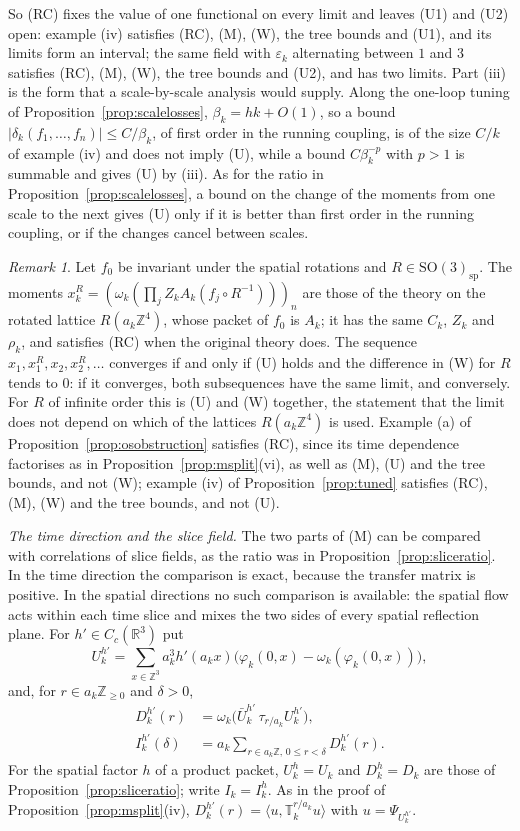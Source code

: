 \documentclass[aps,prd,twocolumn,superscriptaddress,nofootinbib,longbibliography,floatfix,amsmath,amssymb,10pt]{revtex4-2}
\theoremstyle{definition}
\theoremstyle{remark}
\newtheorem{remark}[theorem]{Remark}
\newcommand{\R}{\mathbb{R}}
\newcommand{\Z}{\mathbb{Z}}
\newcommand{\SO}{\mathrm{SO}}
\newcommand{\ip}[2]{\langle #1,#2\rangle}
\begin{document}
So (RC) fixes the value of one functional on every limit and leaves (U1)
and (U2) open: example (iv) satisfies (RC), (M), (W), the tree bounds and
(U1), and its limits form an interval; the same field with
$\varepsilon_k$ alternating between $1$ and $3$ satisfies (RC), (M),
(W), the tree bounds and (U2), and has two limits. Part (iii) is the form
that a scale-by-scale analysis would supply. Along the one-loop tuning of
Proposition~\ref{prop:scalelosses}, $\beta_k=hk+O(1)$, so a bound
$|\delta_k(f_1,\dots,f_n)|\le C/\beta_k$, of first order in the running
coupling, is of the size $C/k$ of example (iv) and does not imply (U),
while a bound $C\beta_k^{-p}$ with $p>1$ is summable and gives (U) by
(iii). As for the ratio in Proposition~\ref{prop:scalelosses}, a bound on
the change of the moments from one scale to the next gives (U) only if it
is better than first order in the running coupling, or if the changes
cancel between scales.

\begin{remark}\label{rem:rotatedlattice}
Let $f_0$ be invariant under the spatial rotations and
$R\in\SO(3)_{\mathrm{sp}}$. The moments $x^R_k=(\omega_k(\prod_jZ_kA_k(f_j
\circ R^{-1})))_n$ are those of the theory on the rotated lattice
$R(a_k\Z^4)$, whose packet of $f_0$ is $A_k$; it has the same $C_k$, $Z_k$
and $\rho_k$, and satisfies (RC) when the original theory does. The
sequence $x_1,x^R_1,x_2,x^R_2,\dots$ converges if and only if (U) holds
and the difference in (W) for $R$ tends to $0$: if it converges, both
subsequences have the same limit, and conversely. For $R$ of infinite order
this is (U) and (W) together, the statement that the limit does not depend
on which of the lattices $R(a_k\Z^4)$ is used. Example (a) of
Proposition~\ref{prop:osobstruction} satisfies (RC), since its time
dependence factorises as in Proposition~\ref{prop:msplit}(vi), as well as
(M), (U) and the tree bounds, and not (W); example (iv) of
Proposition~\ref{prop:tuned} satisfies (RC), (M), (W) and the tree
bounds, and not (U).
\end{remark}

\emph{The time direction and the slice field.} The two parts of (M) can be
compared with correlations of slice fields, as the ratio was in
Proposition~\ref{prop:sliceratio}. In the time direction the comparison is
exact, because the transfer matrix is positive. In the spatial directions no
such comparison is available: the spatial flow acts within each time slice
and mixes the two sides of every spatial reflection plane. For
$h'\in C_c(\R^3)$ put
\[
U^{h'}_k=\sum_{x\in\Z^3}a_k^3h'(a_kx)\bigl(\varphi_k(0,x)-\omega_k(
\varphi_k(0,x))\bigr),
\]
and, for $r\in a_k\Z_{\ge0}$ and $\delta>0$,
\[
\begin{split}
D^{h'}_k(r)&=\omega_k\bigl(\bar U^{h'}_k\,\tau_{r/a_k}U^{h'}_k\bigr),\\
I^{h'}_k(\delta)&=a_k\!\!\sum_{r\in a_k\Z,\,0\le r<\delta}\!\!D^{h'}_k(r).
\end{split}
\]
For the spatial factor $h$ of a product packet, $U^h_k=U_k$ and
$D^h_k=D_k$ are those of Proposition~\ref{prop:sliceratio}; write
$I_k=I^h_k$. As in the proof of Proposition~\ref{prop:msplit}(iv),
$D^{h'}_k(r)=\ip u{\mathbb T_k^{r/a_k}u}$ with $u=\Psi_{U^{h'}_k}$.
\end{document}
